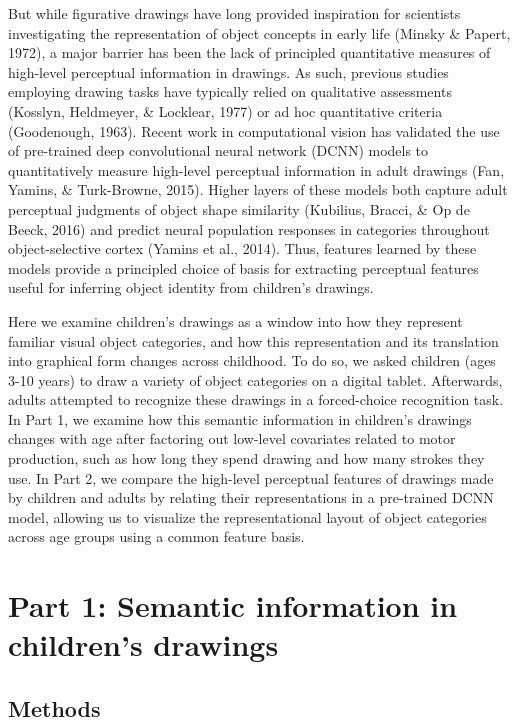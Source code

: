 \documentclass[10pt, letterpaper]{article}
\begin{document}
But while figurative drawings have long provided inspiration for
scientists investigating the representation of object concepts in early
life (Minsky \& Papert, 1972), a major barrier has been the lack of
principled quantitative measures of high-level perceptual information in
drawings. As such, previous studies employing drawing tasks have
typically relied on qualitative assessments (Kosslyn, Heldmeyer, \&
Locklear, 1977) or ad hoc quantitative criteria (Goodenough, 1963).
Recent work in computational vision has validated the use of pre-trained
deep convolutional neural network (DCNN) models to quantitatively
measure high-level perceptual information in adult drawings (Fan,
Yamins, \& Turk-Browne, 2015). Higher layers of these models both
capture adult perceptual judgments of object shape similarity (Kubilius,
Bracci, \& Op de Beeck, 2016) and predict neural population responses in
categories throughout object-selective cortex (Yamins et al., 2014).
Thus, features learned by these models provide a principled choice of
basis for extracting perceptual features useful for inferring object
identity from children's drawings.

Here we examine children's drawings as a window into how they represent
familiar visual object categories, and how this representation and its
translation into graphical form changes across childhood. To do so, we
asked children (ages 3-10 years) to draw a variety of object categories
on a digital tablet. Afterwards, adults attempted to recognize these
drawings in a forced-choice recognition task. In Part 1, we examine how
this semantic information in children's drawings changes with age after
factoring out low-level covariates related to motor production, such as
how long they spend drawing and how many strokes they use. In Part 2, we
compare the high-level perceptual features of drawings made by children
and adults by relating their representations in a pre-trained DCNN
model, allowing us to visualize the representational layout of object
categories across age groups using a common feature basis.

\section{Part 1: Semantic information in children's
drawings}\label{part-1-semantic-information-in-childrens-drawings}

\subsection{Methods}\label{methods}
\end{document}
